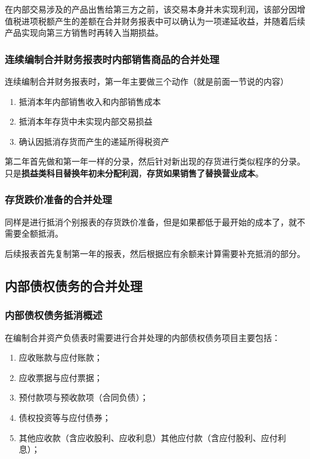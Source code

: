 \documentclass[UTF8,12pt]{ctexart}
\numberwithin{equation}{section} %
\numberwithin{figure}{section}
\numberwithin{table}{section}
\begin{document}
	在内部交易涉及的产品出售给第三方之前，该交易本身并未实现利润，该部分因增值税进项税额产生的差额在合并财务报表中可以确认为一项递延收益，并随着后续产品实现向第三方销售时再转入当期损益。
	
	
	\subsubsection{连续编制合并财务报表时内部销售商品的合并处理}
	
	连续编制合并财务报表时，第一年主要做三个动作（就是前面一节说的内容）
	\begin{enumerate}
		\item 抵消本年内部销售收入和内部销售成本
		
		\item 抵消本年存货中未实现内部交易损益
		
		\item 确认因抵消存货而产生的递延所得税资产
	\end{enumerate}
	
	第二年首先做和第一年一样的分录，然后针对新出现的存货进行类似程序的分录。只是\textbf{损益类科目替换年初未分配利润}，\textbf{存货如果销售了替换营业成本}。
	
	
	\subsubsection{存货跌价准备的合并处理}
	同样是进行抵消个别报表的存货跌价准备，但是如果都低于最开始的成本了，就不需要全额抵消。
	
	后续报表首先复制第一年的报表，然后根据应有余额来计算需要补充抵消的部分。
	
	\subsection{内部债权债务的合并处理}
	\subsubsection{内部债权债务抵消概述}
	在编制合并资产负债表时需要进行合并处理的内部债权债务项目主要包括：
	\begin{enumerate}
		\item 应收账款与应付账款；
		
		\item 应收票据与应付票据；
		
		\item 预付款项与预收款项（合同负债）；
		
		\item 债权投资等与应付债券；
		
		\item 其他应收款（含应收股利、应收利息）其他应付款（含应付股利、应付利息）；
	\end{enumerate}
	
\end{document}
